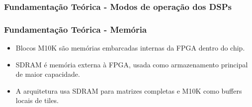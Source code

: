 \documentclass{beamer}
\begin{document}
\begin{frame}
\frametitle{Fundamentação Teórica - Modos de operação dos DSPs}

\begin{table}
\centering
\tiny
\caption{Modos de operação dos blocos DSP de precisão variável no Cyclone V\protect\supercite{altera2023cyclonev}.}
\label{tab:dsp-modes}
\end{table}

\end{frame}

\begin{frame}
\frametitle{Fundamentação Teórica - Memória}

\begin{itemize}
    \item Blocos M10K são memórias embarcadas internas da FPGA dentro do chip.
    \item SDRAM é memória externa à FPGA, usada como armazenamento principal de maior capacidade.
    \item A arquitetura usa SDRAM para matrizes completas e M10K como buffers locais de tiles.
\end{itemize}

\end{frame}
\end{document}
